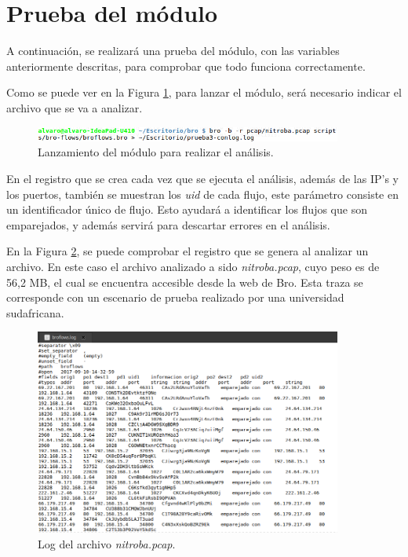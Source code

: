 \section{Prueba del módulo}

A continuación, se realizará una prueba del módulo, con las variables anteriormente descritas, para comprobar que todo funciona 
correctamente.

\intro Como se puede ver en la Figura \ref{fig.terminal}, para lanzar el módulo, será necesario indicar el archivo que se va a 
analizar.

\begin{figure}[H]
  \includegraphics[width=0.9\textwidth]{imagenes/terminal.png}
  \centering
  \caption{Lanzamiento del módulo para realizar el análisis.}\label{fig.terminal}
\end{figure}

\intro En el registro que se crea cada vez que se ejecuta el análisis, además de las IP's y los puertos, también se muestran los 
\textit{uid} de cada flujo, este parámetro consiste en un identificador único de flujo. Esto ayudará a identificar los flujos que son 
emparejados, y además servirá para descartar errores en el análisis.

\intro En la Figura \ref{fig.lognitroba}, se puede comprobar el registro que se genera al analizar un archivo. En este caso el archivo 
analizado a sido \textit{nitroba.pcap}, cuyo peso es de 56,2 MB, el cual se encuentra accesible desde la web de Bro. Esta traza se 
corresponde con un escenario de prueba realizado por una universidad sudafricana. 

\begin{figure}[H]
  \includegraphics[width=0.9\textwidth]{imagenes/lognitroba.png}
  \centering
  \caption{Log del archivo \textit{nitroba.pcap}.}\label{fig.lognitroba}
\end{figure}

